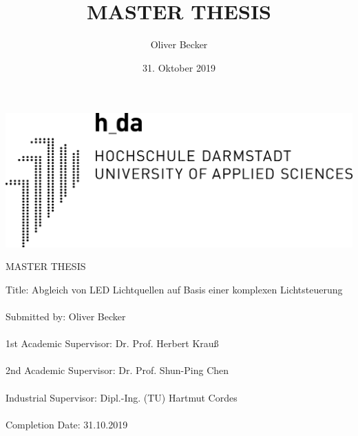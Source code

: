 \documentclass{scrartcl}
\title{MASTER THESIS}
\author{Oliver Becker}
\date{31. Oktober 2019} %
\begin{document}
\begin{center}
    \center\includegraphics[width=0.4\linewidth]{logo.png}

    MASTER THESIS
\end{center}

Title:  Abgleich von LED Lichtquellen auf Basis einer komplexen Lichtsteuerung\\
\\
Submitted by:   Oliver Becker\\
\\
1st Academic Supervisor:    Dr. Prof. Herbert Krauß\\
\\
2nd Academic Supervisor:    Dr. Prof. Shun-Ping Chen\\
\\
Industrial Supervisor:      Dipl.-Ing. (TU) Hartmut Cordes\\
\\
Completion Date:    31.10.2019
\clearpage

\tableofcontents
\clearpage
\end{document}
